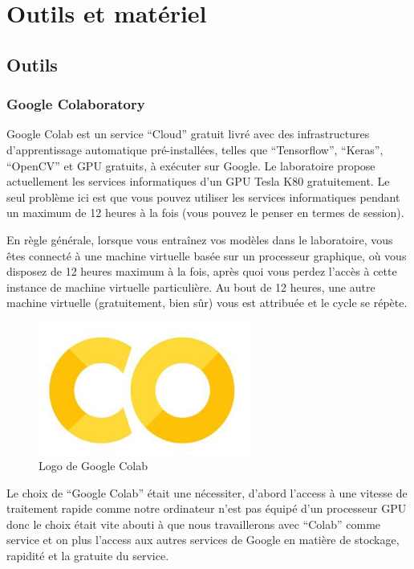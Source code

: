\documentclass[12pt]{article}
\begin{document}
\section{Outils et matériel}
\subsection{Outils}
\subsubsection*{Google Colaboratory}
Google Colab est un service “Cloud” gratuit livré avec des infrastructures d’apprentissage automatique pré-installées, telles que “Tensorflow”, “Keras”, “OpenCV” et GPU gratuits, à exécuter sur Google. Le laboratoire propose actuellement les services informatiques d’un GPU Tesla K80 gratuitement. Le seul problème ici est que vous pouvez utiliser les services informatiques pendant un maximum de 12 heures à la fois (vous pouvez le penser en termes de session). 

En règle générale, lorsque vous entraînez vos modèles dans le laboratoire, vous êtes connecté à une machine virtuelle basée sur un processeur graphique, où vous disposez de 12 heures maximum à la fois, après quoi vous perdez l'accès à cette instance de machine virtuelle particulière. Au bout de 12 heures, une autre machine virtuelle (gratuitement, bien sûr) vous est attribuée et le cycle se répète.

\begin{figure}[h]
	\centering
	\includegraphics[width=7cm]{img-Chapiter-4/colab.png}
	\caption{Logo de Google Colab}
\end{figure}

Le choix de “Google Colab” était une nécessiter, d’abord l’access à une vitesse de traitement rapide comme notre ordinateur n’est pas équipé d’un processeur GPU donc le choix était vite abouti à que nous travaillerons avec “Colab” comme service et on plus l’access aux autres services de Google en matière de stockage, rapidité et la gratuite du service.
\end{document}
